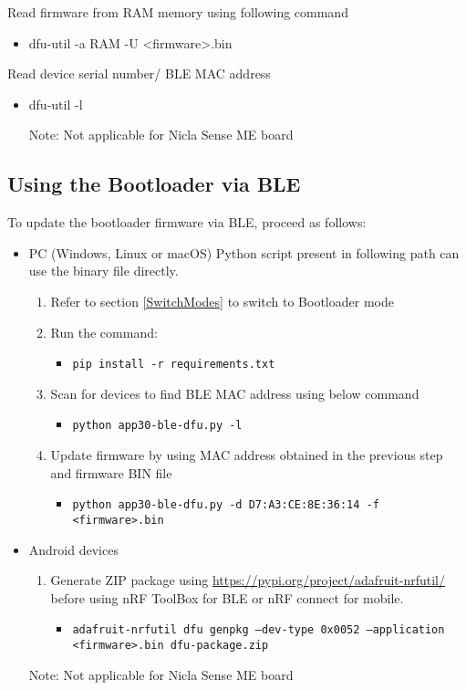 \documentclass{article}
\begin{document}
Read firmware from RAM memory using following command
\begin{itemize}
	\item dfu-util -a RAM -U <firmware>.bin
\end{itemize}

Read device serial number/ BLE MAC address
\begin{itemize}
	\item dfu-util -l
	
Note: Not applicable for Nicla Sense ME board
\end{itemize}

\subsection{Using the Bootloader via BLE}
To update the bootloader firmware via BLE, proceed as follows:
\begin{itemize}
	\item PC (Windows, Linux or macOS)
	\newline Python script present in following path  can use the binary file directly.
	\begin{enumerate}[label=\roman*.]
		\item Refer to section \ref{SwitchModes} to switch to Bootloader mode
		\item Run the command:
		\begin{itemize}
			\item \texttt{pip install -r requirements.txt}
		\end{itemize} 
		\item Scan for devices to find BLE MAC address using below command
		\begin{itemize}
			\item \texttt{python app30-ble-dfu.py -l}
		\end{itemize} 
		\item Update firmware by using MAC address obtained in the previous step and firmware BIN file
		\begin{itemize}
			\item \texttt{python app30-ble-dfu.py -d D7:A3:CE:8E:36:14 -f <firmware>.bin}
		\end{itemize}
	\end{enumerate}
	\item Android devices
	\begin{enumerate}[label=\roman*.]
		\item Generate ZIP package using \url{https://pypi.org/project/adafruit-nrfutil/} before using nRF ToolBox for BLE or nRF connect for mobile.
		\begin{itemize}
			\item \texttt{adafruit-nrfutil dfu genpkg --dev-type 0x0052 --application <firmware>.bin dfu-package.zip}
		\end{itemize} 
	\end{enumerate}
Note: Not applicable for Nicla Sense ME board
\end{itemize}

\newpage
\end{document}
